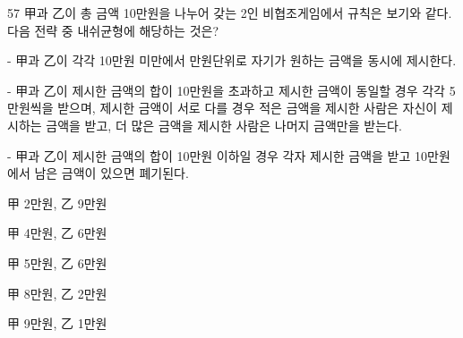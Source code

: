 \begin{question}{57}
甲과 乙이 총 금액 10만원을 나누어 갖는 2인 비협조게임에서 규칙은 보기와 같다. 다음 전략 중 내쉬균형에 해당하는 것은?
\begin{bogi}
- 甲과 乙이 각각 10만원 미만에서 만원단위로 자기가 원하는 금액을 동시에 제시한다. \par
- 甲과 乙이 제시한 금액의 합이 10만원을 초과하고 제시한 금액이 동일할 경우 각각 5만원씩을 받으며, 제시한 금액이 서로 다를 경우 적은 금액을 제시한 사람은 자신이 제시하는 금액을 받고, 더 많은 금액을 제시한 사람은 나머지 금액만을 받는다. \par
- 甲과 乙이 제시한 금액의 합이 10만원 이하일 경우 각자 제시한 금액을 받고 10만원에서 남은 금액이 있으면 폐기된다.
\end{bogi}
\begin{choices}
  \item 甲 2만원, 乙 9만원
  \item 甲 4만원, 乙 6만원
  \item 甲 5만원, 乙 6만원
  \item 甲 8만원, 乙 2만원
  \item 甲 9만원, 乙 1만원
\end{choices}
\end{question}
